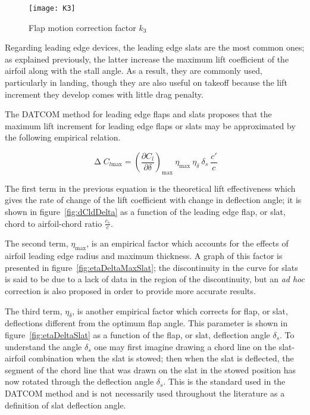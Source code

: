 \begin{figure}[H]
  \centering
  \texttt{[image: K3]}
  \caption{Flap motion correction factor $k_3$}
  \label{fig:k3}
\end{figure}

\noindent
Regarding leading edge devices, the leading edge slats are the most common ones; as explained previously, the latter increase the maximum lift coefficient of the airfoil along with the stall angle. As a result, they are commonly used, particularly in landing, though they are also useful on takeoff because the lift increment they develop comes with little drag penalty.

The DATCOM method for leading edge flaps and slats proposes that the maximum lift increment for leading edge flaps or slats may be approximated by the following empirical relation.

\begin{equation}
\upDelta C_{l\text{max}}=\left(\dfrac{\partial C_l}{\partial \delta}\right)_{\text{max}}\ \eta_{\text{max}}\ \eta_\delta\ \delta_s\ \dfrac{c'}{c}
\label{eqn:DeltaClmaxSlat}
\end{equation}

\noindent
The first term in the previous equation is the theoretical lift effectiveness which gives the rate of change of the lift coefficient with change in deflection angle; it is shown in figure~\ref{fig:dCldDelta} as a function of the leading edge flap, or slat, chord to airfoil-chord ratio $\frac{c_s}{c}$.

The second term, $\eta_{\text{max}}$, is an empirical factor which accounts for the effects of airfoil leading edge radius and maximum thickness. A graph of this factor is presented in figure~\ref{fig:etaDeltaMaxSlat}; the discontinuity in the curve for slats is said to be due to a lack of data in the region of the discontinuity, but an \emph{ad hoc} correction is also proposed in order to provide more accurate results.

The third term, $\eta_\delta$, is another empirical factor which corrects for flap, or slat, deflections different from the optimum flap angle. This parameter is shown in figure~\ref{fig:etaDeltaSlat} as a function of the flap, or slat, deflection angle $\delta_s$. To understand the angle $\delta_s$ one may first imagine
drawing a chord line on the slat-airfoil combination when the slat is stowed; then when the slat is deflected, the segment of the chord line that was drawn on
the slat in the stowed position has now rotated through the deflection angle $\delta_s$. This is the standard used in the DATCOM method and is not necessarily used throughout the literature as a definition of slat deflection angle.

